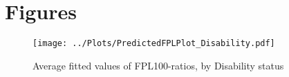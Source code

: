 
\section{Figures}

\begin{figure}[H]
\caption{Average fitted values of FPL100-ratios, by Disability status}
\centering
\texttt{[image: ../Plots/PredictedFPLPlot\_Disability.pdf]}
\label{fig:disability}
\end{figure}





